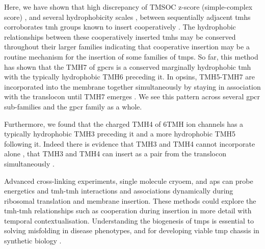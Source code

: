 Here, we have shown that high discrepancy of TMSOC  z\--score (simple-complex score) \cite{Wong2011, Wong2012}, and several hydrophobicity scales \cite{Hessa2005, Kyte1982, White1999, Eisenberg1984}, between sequentially adjacent \gls{tmh}s corroborates \gls{tmh} groups known to insert cooperatively \cite{Ismail2008, Sato2003, Zhang2007, Cymer2015}.
The hydrophobic relationships between these cooperatively inserted \gls{tmh}s may be conserved throughout their larger families indicating that cooperative insertion may be a routine mechanism for the insertion of some families of \gls{tmp}s.
So far, this method has shown that the TMH7 of \gls{gpcr}s is a conserved marginally hydrophobic \gls{tmh} with the typically hydrophobic TMH6 preceding it.
In opsins, TMH5\--TMH7 are incorporated into the membrane together simultaneously by staying in association with the translocon until TMH7 emerges \cite{Ismail2008}.
We see this pattern across several \gls{gpcr} sub\--families and the \gls{gpcr} family as a whole.

Furthermore, we found that the charged TMH4 of 6TMH ion channels has a typically hydrophobic TMH3 preceding it and a more hydrophobic TMH5 following it.
Indeed there is evidence that TMH3 and TMH4 cannot incorporate alone \cite{Sato2003}, that TMH3 and TMH4 can insert as a pair from the translocon simultaneously \cite{Zhang2007, Cymer2015}.

Advanced cross\--linking experiments, single molecule cryo\gls{em}, and \gls{ap}s can probe energetics and \gls{tmh}\--\gls{tmh} interactions and associations dynamically during ribosomal translation and membrane insertion.
These methods could explore the \gls{tmh}\--\gls{tmh} relationships such as cooperation during insertion in more detail with temporal contextualisation.
Understanding the biogenesis of \gls{tmp}s is essential to solving misfolding in disease phenotypes, and for developing viable \gls{tmp} chassis in synthetic biology \cite{Kang2018}.

